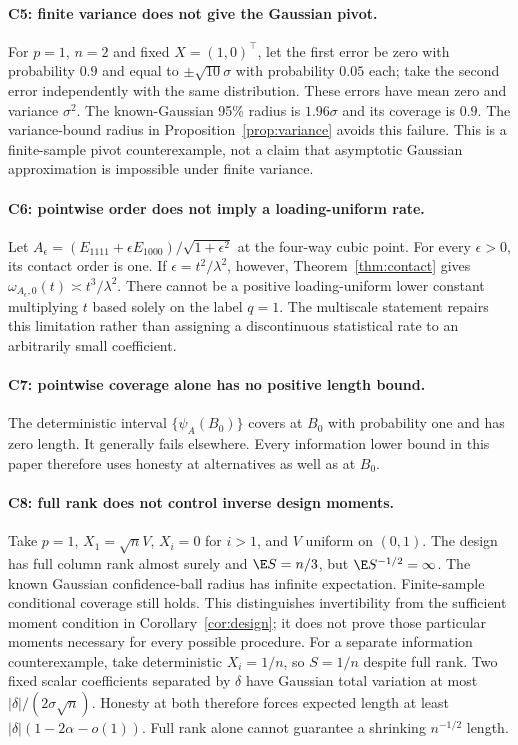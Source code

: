 \paragraph{C5: finite variance does not give the Gaussian pivot.}
For $p=1$, $n=2$ and fixed $X=(1,0)^\top$, let the first error be zero with probability $0.9$ and equal to $\pm\sqrt{10}\sigma$ with probability $0.05$ each; take the second error independently with the same distribution. These errors have mean zero and variance $\sigma^2$. The known-Gaussian 95\% radius is $1.96\sigma$ and its coverage is $0.9$. The variance-bound radius in Proposition~\ref{prop:variance} avoids this failure. This is a finite-sample pivot counterexample, not a claim that asymptotic Gaussian approximation is impossible under finite variance.

\paragraph{C6: pointwise order does not imply a loading-uniform rate.}
Let $A_\epsilon=(E_{1111}+\epsilon E_{1000})/\sqrt{1+\epsilon^2}$ at the four-way cubic point. For every $\epsilon>0$, its contact order is one. If $\epsilon=t^2/\lambda^2$, however, Theorem~\ref{thm:contact} gives $\omega_{A_\epsilon,0}(t)\asymp t^3/\lambda^2$. There cannot be a positive loading-uniform lower constant multiplying $t$ based solely on the label $q=1$. The multiscale statement repairs this limitation rather than assigning a discontinuous statistical rate to an arbitrarily small coefficient.

\paragraph{C7: pointwise coverage alone has no positive length bound.}
The deterministic interval $\{\psi_A(B_0)\}$ covers at $B_0$ with probability one and has zero length. It generally fails elsewhere. Every information lower bound in this paper therefore uses honesty at alternatives as well as at $B_0$.

\paragraph{C8: full rank does not control inverse design moments.}
Take $p=1$, $X_1=\sqrt n V$, $X_i=0$ for $i>1$, and $V$ uniform on $(0,1)$. The design has full column rank almost surely and $\E S=n/3$, but $\E S^{-1/2}=\infty$. The known Gaussian confidence-ball radius has infinite expectation. Finite-sample conditional coverage still holds. This distinguishes invertibility from the sufficient moment condition in Corollary~\ref{cor:design}; it does not prove those particular moments necessary for every possible procedure. For a separate information counterexample, take deterministic $X_i=1/n$, so $S=1/n$ despite full rank. Two fixed scalar coefficients separated by $\delta$ have Gaussian total variation at most $|\delta|/(2\sigma\sqrt n)$. Honesty at both therefore forces expected length at least $|\delta|(1-2\alpha-o(1))$. Full rank alone cannot guarantee a shrinking $n^{-1/2}$ length.


